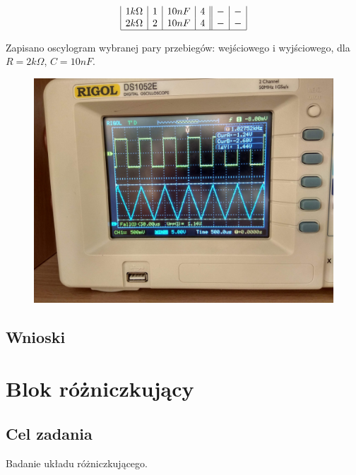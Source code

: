 \documentclass[polish,polish,a4paper]{article}
\begin{document}
\begin{spacing}{1.3}
\begin{spacing}{2}
\begin{equation*}
\begin{array}{|r|r|r|r||r|r|}
1k\Omega&1&10nF&4&-&-\\
2k\Omega&2&10nF&4&-&-\\
\hline

\end{array}
\end{equation*}
\end{spacing}

Zapisano oscylogram wybranej pary przebiegów: wejściowego i wyjściowego, dla $R = 2k\Omega$, $C = 10nF$.

\begin{figure}[H]
	\centering
	\includegraphics[scale=0.1]{151.jpg}
\end{figure}


\subsection{Wnioski}

\section{Blok różniczkujący} %

\subsection{Cel zadania}

Badanie układu różniczkującego.


\end{spacing}
\end{document}
